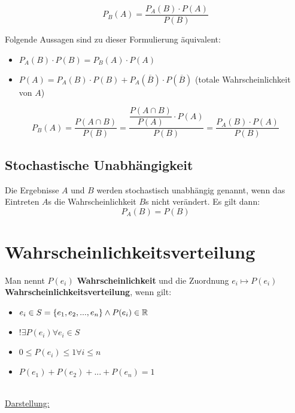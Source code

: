 \documentclass[../MAIN/main.tex]{subfiles}
\begin{document}
\begin{Theorem}
  $$P_B(A)=\dfrac{P_A(B)\cdot P(A)}{P(B)}$$
\end{Theorem}
\begin{Bemerkung}
  Folgende Aussagen sind zu dieser Formulierung äquivalent:
  \begin{itemize}
    \item $P_A(B)\cdot P(B) = P_B(A)\cdot P(A)$
    \item $P(A) = P_A(B) \cdot P(B) + P_A(\overline B) \cdot P(\overline B)$ (totale Wahrscheinlichkeit von $A$)
  \end{itemize}
\end{Bemerkung}
\begin{Beweis}
  $$P_B(A) = \dfrac{P(A\cap B)}{P(B)} = \dfrac{\dfrac{P(A\cap B)}{P(A)}\cdot P(A)}{P(B)} = \dfrac{P_A(B)\cdot P(A)}{P(B)}$$
\end{Beweis}
\subsection{Stochastische Unabhängigkeit}
\begin{Definition}
  Die Ergebnisse $A$ und $B$ werden stochastisch unabhängig genannt, wenn das Eintreten $A$s die Wahrscheinlichkeit $B$s nicht verändert. Es gilt dann:
  $$P_A(B)=P(B)$$
\end{Definition}



\section{Wahrscheinlichkeitsverteilung}
\begin{Definition}
  Man nennt $P(e_i)$ \textbf{Wahrscheinlichkeit} und die Zuordnung $e_i \longmapsto P(e_i)$ \textbf{Wahrscheinlichkeitsverteilung}, wenn gilt:
  \begin{itemize}
    \item $e_i \in S=\{ e_1,e_2,...,e_n\} \land P(e_i)\in \mathbb{R}$
    \item $!\exists P(e_i) \forall e_i \in S$
    \item $0 \leq P(e_i)\leq 1 \forall i \leq n$
    \item $P(e_1)+P(e_2)+...+P(e_n)=1$
  \end{itemize}
\end{Definition}\\
\underline{Darstellung:}\\
\end{document}
